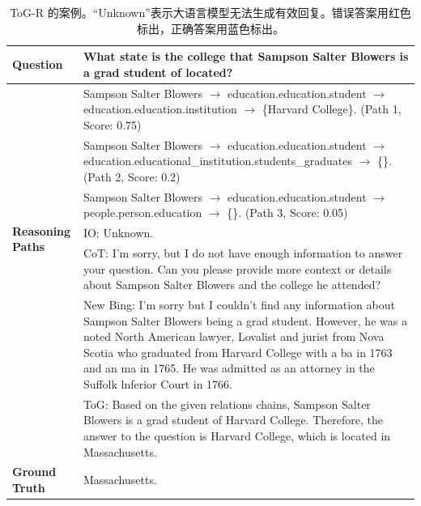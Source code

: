 \documentclass[11pt,UTF8,fontset=fandol]{ctexart}
\newcommand{\wrong}[1]{\textcolor{wrongred}{#1}}
\newcommand{\correct}[1]{\textcolor{rightblue}{#1}}
\begin{document}
\begin{table}[H]\centering
\caption{ToG-R 的案例。“Unknown”表示大语言模型无法生成有效回复。错误答案用\wrong{红色}标出，正确答案用\correct{蓝色}标出。}
\label{tab:21}
\small
\renewcommand{\arraystretch}{1.25}
\begin{tabular}{p{}p{}}
\toprule
\textbf{Question} & What state is the college that Sampson Salter Blowers is a grad student of located? \\
\midrule
\multirow{6}{*}{\parbox{0.16\textwidth}{\textbf{Reasoning Paths}}}
& Sampson Salter Blowers $\rightarrow$ education.education.student $\rightarrow$ education.education.institution $\rightarrow$ \{Harvard College\}. (Path 1, Score: 0.75) \\
& Sampson Salter Blowers $\rightarrow$ education.education.student $\rightarrow$ education.educational\_institution.students\_graduates $\rightarrow$ \{\}. (Path 2, Score: 0.2) \\
& Sampson Salter Blowers $\rightarrow$ education.education.student $\rightarrow$ people.person.education $\rightarrow$ \{\}. (Path 3, Score: 0.05) \\
\midrule
\multirow{6}{*}{\textbf{Outputs}}
& IO: \wrong{Unknown.} \\
& CoT: \wrong{I'm sorry, but I do not have enough information to answer your question.} Can you please provide more context or details about Sampson Salter Blowers and the college he attended? \\
& New Bing: I'm sorry but I couldn't find any information about Sampson Salter Blowers being a grad student. However, he was a noted North American lawyer, Lovalist and jurist from Nova Scotia who graduated from \correct{Harvard College} with a ba in 1763 and an ma in 1765. He was admitted as an attorney in the Suffolk lnferior Court in 1766. \\
& ToG: Based on the given relations chains, Sampson Salter Blowers is a grad student of Harvard College. Therefore, the answer to the question is Harvard College, which is located in \correct{Massachusetts}. \\
\midrule
\textbf{Ground Truth} & Massachusetts. \\
\bottomrule
\end{tabular}
\end{table}
\end{document}

